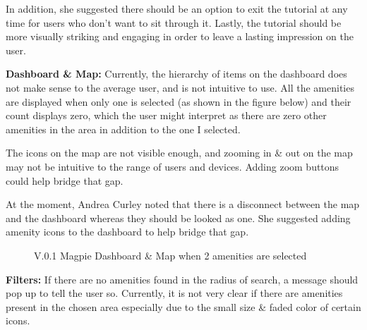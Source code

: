 In addition, she suggested there should be an option to exit the tutorial at any
time for users who don't want to sit through it. Lastly, the tutorial should be
more visually striking and engaging in order to leave a lasting impression on
the user.

\textbf{Dashboard \& Map: }
Currently, the hierarchy of items on the dashboard does not make sense to the
average user, and is not intuitive to use. All the amenities are displayed when only
one is selected (as shown in the figure below) and their count displays zero,
which the user might interpret as there are zero other amenities in the area in
addition to the one I selected.

The icons on the map are not visible enough, and zooming in \& out on the map
may not be intuitive to the range of users and devices. Adding zoom buttons
could help bridge that gap.

At the moment, Andrea Curley noted that there is a disconnect between the map
and the dashboard whereas they should be looked as one. She suggested adding
amenity icons to the dashboard to help bridge that gap.
\begin{figure}[h!]
    \centering
    \caption{V.0.1 Magpie Dashboard \& Map when 2 amenities are selected}
\end{figure}

\textbf{Filters: }
If there are no amenities found in the radius of search, a message should pop up
to tell the user so. Currently, it is not very clear if there are amenities
present in the chosen area especially due to the small size \& faded color of
certain icons.

